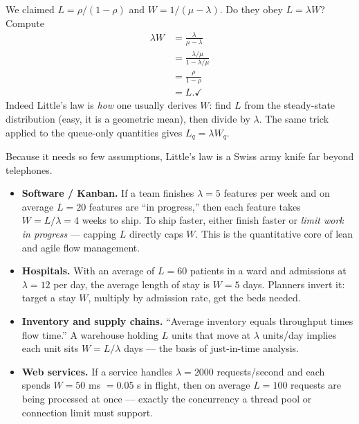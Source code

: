 \begin{example}
\label{ch27:ex-little-check}
We claimed $L = \rho/(1-\rho)$ and $W = 1/(\mu-\lambda)$. Do they obey $L = \lambda W$? Compute
\begin{align*}
  \lambda W &= \frac{\lambda}{\mu - \lambda} \\
            &= \frac{\lambda/\mu}{1 - \lambda/\mu} \\
            &= \frac{\rho}{1-\rho} \\
            &= L. \checkmark
\end{align*}
Indeed Little's law is \emph{how} one usually derives $W$: find $L$ from the steady-state
distribution (easy, it is a geometric mean), then divide by $\lambda$. The same trick applied to the
queue-only quantities gives $L_q = \lambda W_q$.
\end{example}

\begin{applicationbox}
Because it needs so few assumptions, Little's law is a Swiss army knife far beyond telephones.
\begin{itemize}
  \item \textbf{Software / Kanban.} If a team finishes $\lambda = 5$ features per week and on average
  $L = 20$ features are ``in progress,'' then each feature takes $W = L/\lambda = 4$ weeks to ship.
  To ship faster, either finish faster or \emph{limit work in progress} --- capping $L$ directly caps
  $W$. This is the quantitative core of lean and agile flow management.
  \item \textbf{Hospitals.} With an average of $L = 60$ patients in a ward and admissions at
  $\lambda = 12$ per day, the average length of stay is $W = 5$ days. Planners invert it: target a
  stay $W$, multiply by admission rate, get the beds needed.
  \item \textbf{Inventory and supply chains.} ``Average inventory equals throughput times flow
  time.'' A warehouse holding $L$ units that move at $\lambda$ units/day implies each unit sits
  $W = L/\lambda$ days --- the basis of just-in-time analysis.
  \item \textbf{Web services.} If a service handles $\lambda = 2000$ requests/second and each spends
  $W = 50$ ms $= 0.05$ s in flight, then on average $L = 100$ requests are being processed at once
  --- exactly the concurrency a thread pool or connection limit must support.
\end{itemize}
\end{applicationbox}

